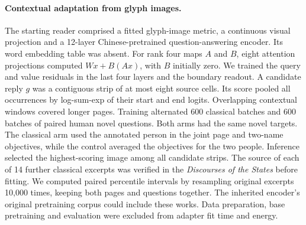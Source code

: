 \paragraph{Contextual adaptation from glyph images.}
The starting reader comprised a fitted glyph-image metric, a continuous visual projection and a 12-layer Chinese-pretrained question-answering encoder. Its word embedding table was absent. For rank four maps $A$ and $B$, eight attention projections computed $Wx+B(Ax)$, with $B$ initially zero. We trained the query and value residuals in the last four layers and the boundary readout. A candidate reply $g$ was a contiguous strip of at most eight source cells. Its score pooled all occurrences by log-sum-exp of their start and end logits. Overlapping contextual windows covered longer pages. Training alternated 600 classical batches and 600 batches of paired human novel questions. Both arms had the same novel targets. The classical arm used the annotated person in the joint page and two-name objectives, while the control averaged the objectives for the two people. Inference selected the highest-scoring image among all candidate strips. The source of each of 14 further classical excerpts was verified in the \textit{Discourses of the States} before fitting. We computed paired percentile intervals by resampling original excerpts 10,000 times, keeping both pages and questions together. The inherited encoder's original pretraining corpus could include these works. Data preparation, base pretraining and evaluation were excluded from adapter fit time and energy.
